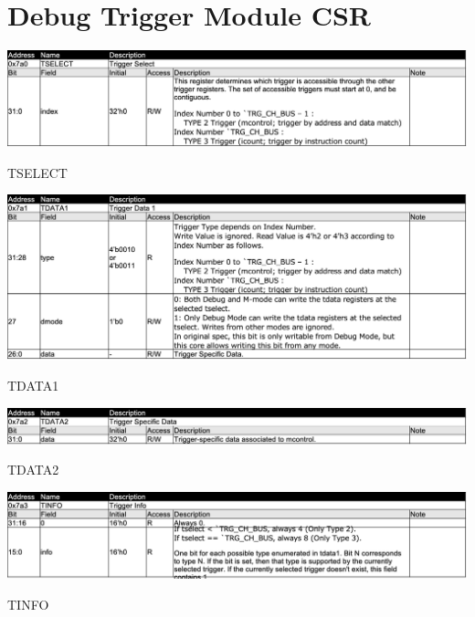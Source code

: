\section{Debug Trigger Module CSR}

\begin{table}[H]
    \includegraphics[width=1.00\columnwidth]{./Table/TSELECT.png}
    \caption{TSELECT}
    \label{tb:TSELECT}
\end{table}

\begin{table}[H]
    \includegraphics[width=1.00\columnwidth]{./Table/TDATA1.png}
    \caption{TDATA1}
    \label{tb:TDATA1}
\end{table}

\begin{table}[H]
    \includegraphics[width=1.00\columnwidth]{./Table/TDATA2.png}
    \caption{TDATA2}
    \label{tb:TDATA2}
\end{table}

\begin{table}[H]
    \includegraphics[width=1.00\columnwidth]{./Table/TINFO.png}
    \caption{TINFO}
    \label{tb:TINFO}
\end{table}

